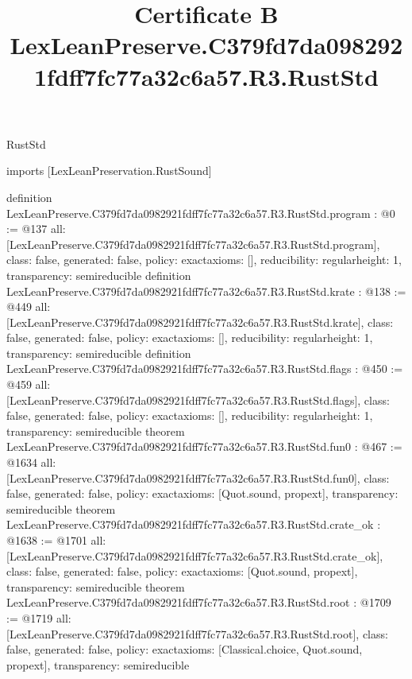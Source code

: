 \begin{lexlean}{RustStd}
\title{Certificate B LexLeanPreserve.C379fd7da0982921fdff7fc77a32c6a57.R3.RustStd}
\begin{coremodule}
imports [LexLeanPreservation.RustSound]

definition LexLeanPreserve.C379fd7da0982921fdff7fc77a32c6a57.R3.RustStd.program : @0 := @137 {
  all: [LexLeanPreserve.C379fd7da0982921fdff7fc77a32c6a57.R3.RustStd.program],
  class: false,
  generated: false,
  policy: exact{axioms: []},
  reducibility: regular{height: 1},
  transparency: semireducible
}
definition LexLeanPreserve.C379fd7da0982921fdff7fc77a32c6a57.R3.RustStd.krate : @138 := @449 {
  all: [LexLeanPreserve.C379fd7da0982921fdff7fc77a32c6a57.R3.RustStd.krate],
  class: false,
  generated: false,
  policy: exact{axioms: []},
  reducibility: regular{height: 1},
  transparency: semireducible
}
definition LexLeanPreserve.C379fd7da0982921fdff7fc77a32c6a57.R3.RustStd.flags : @450 := @459 {
  all: [LexLeanPreserve.C379fd7da0982921fdff7fc77a32c6a57.R3.RustStd.flags],
  class: false,
  generated: false,
  policy: exact{axioms: []},
  reducibility: regular{height: 1},
  transparency: semireducible
}
theorem LexLeanPreserve.C379fd7da0982921fdff7fc77a32c6a57.R3.RustStd.fun0 : @467 := @1634 {
  all: [LexLeanPreserve.C379fd7da0982921fdff7fc77a32c6a57.R3.RustStd.fun0],
  class: false,
  generated: false,
  policy: exact{axioms: [Quot.sound, propext]},
  transparency: semireducible
}
theorem LexLeanPreserve.C379fd7da0982921fdff7fc77a32c6a57.R3.RustStd.crate_ok : @1638 := @1701 {
  all: [LexLeanPreserve.C379fd7da0982921fdff7fc77a32c6a57.R3.RustStd.crate_ok],
  class: false,
  generated: false,
  policy: exact{axioms: [Quot.sound, propext]},
  transparency: semireducible
}
theorem LexLeanPreserve.C379fd7da0982921fdff7fc77a32c6a57.R3.RustStd.root : @1709 := @1719 {
  all: [LexLeanPreserve.C379fd7da0982921fdff7fc77a32c6a57.R3.RustStd.root],
  class: false,
  generated: false,
  policy: exact{axioms: [Classical.choice, Quot.sound, propext]},
  transparency: semireducible
}


\end{coremodule}
\end{lexlean}
